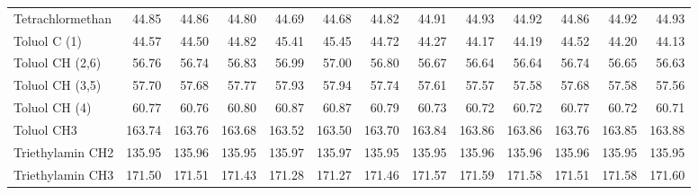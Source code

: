 \begin{table}[ht!]
{\begin{tabular}{lrrrrrrrrrrrr}
    Tetrachlormethan & 44.85 & 44.86 & 44.80 & 44.69 & 44.68 & 44.82 & 44.91 & 44.93 & 44.92 & 44.86 & 44.92 & 44.93 \\
    Toluol C (1) & 44.57 & 44.50 & 44.82 & 45.41 & 45.45 & 44.72 & 44.27 & 44.17 & 44.19 & 44.52 & 44.20 & 44.13 \\
    Toluol CH (2,6) & 56.76 & 56.74 & 56.83 & 56.99 & 57.00 & 56.80 & 56.67 & 56.64 & 56.64 & 56.74 & 56.65 & 56.63 \\
    Toluol CH (3,5) & 57.70 & 57.68 & 57.77 & 57.93 & 57.94 & 57.74 & 57.61 & 57.57 & 57.58 & 57.68 & 57.58 & 57.56 \\
    Toluol CH (4) & 60.77 & 60.76 & 60.80 & 60.87 & 60.87 & 60.79 & 60.73 & 60.72 & 60.72 & 60.77 & 60.72 & 60.71 \\
    Toluol CH3 & 163.74 & 163.76 & 163.68 & 163.52 & 163.50 & 163.70 & 163.84 & 163.86 & 163.86 & 163.76 & 163.85 & 163.88 \\
    Triethylamin CH2 & 135.95 & 135.96 & 135.95 & 135.97 & 135.97 & 135.95 & 135.95 & 135.96 & 135.96 & 135.96 & 135.95 & 135.95 \\
    Triethylamin CH3 & 171.50 & 171.51 & 171.43 & 171.28 & 171.27 & 171.46 & 171.57 & 171.59 & 171.58 & 171.51 & 171.58 & 171.60 \\
    \end{tabular}}%
  \label{tab:sigmacosmo}%
\end{table}%


